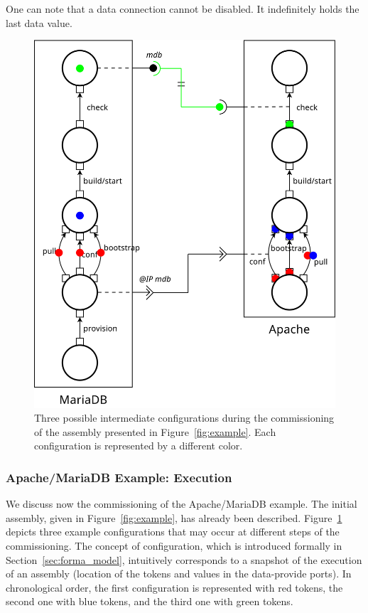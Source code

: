 One can note that a data connection cannot be disabled. It
indefinitely holds the last data value.

\begin{figure}[tbp]
  \begin{center}
    \includegraphics[width=0.7\linewidth]{./images/scenari.pdf}
  \end{center}
  \caption{Three possible intermediate configurations during the commissioning
  of the assembly presented in Figure~\ref{fig:example}. Each configuration is
  represented by a different color.}
  \label{fig:scenari}
\end{figure}

\subsubsection*{Apache/MariaDB Example: \mad Execution}

We discuss now the commissioning of the Apache/MariaDB
example.  The initial assembly, given in Figure~\ref{fig:example}, has
already been described. Figure~\ref{fig:scenari} depicts three example
configurations that may occur at different steps of the commissioning.
The concept of configuration, which is introduced formally in
Section~\ref{sec:forma_model}, intuitively corresponds to a snapshot of
the execution of an assembly (location of the tokens and values
in the data-provide ports). In chronological order, the first
configuration is represented with red tokens, the second one with blue
tokens, and the third one with green tokens.

